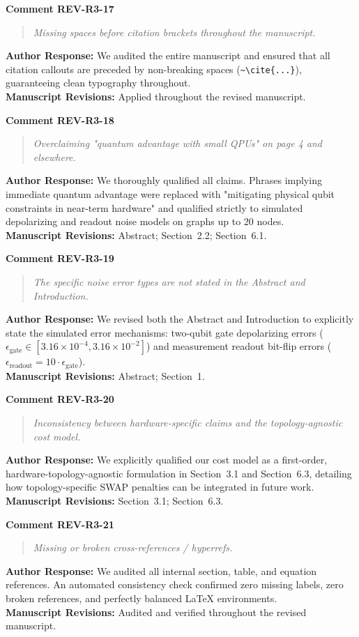 \documentclass[11pt,a4paper]{article}
\newcommand{\commentbox}[2]{
    \vspace{0.8em}
    \noindent\textbf{\textcolor{commentcolor}{#1}}
    \vspace{0.2em}
    \begin{quote}
        \small\itshape #2
    \end{quote}
}
\newcommand{\responsebox}[1]{
    \noindent\textbf{\textcolor{responsecolor}{Author Response:}} #1
    \vspace{0.8em}
}
\begin{document}
\commentbox{Comment REV-R3-17}{Missing spaces before citation brackets throughout the manuscript.}

\responsebox{We audited the entire manuscript and ensured that all citation callouts are preceded by non-breaking spaces (\texttt{\textasciitilde\textbackslash cite\{...\}}), guaranteeing clean typography throughout.
\\[0.3em]
\textbf{Manuscript Revisions:} Applied throughout the revised manuscript.}

\commentbox{Comment REV-R3-18}{Overclaiming "quantum advantage with small QPUs" on page 4 and elsewhere.}

\responsebox{We thoroughly qualified all claims. Phrases implying immediate quantum advantage were replaced with "mitigating physical qubit constraints in near-term hardware" and qualified strictly to simulated depolarizing and readout noise models on graphs up to 20 nodes.
\\[0.3em]
\textbf{Manuscript Revisions:} Abstract; Section~2.2; Section~6.1.}

\commentbox{Comment REV-R3-19}{The specific noise error types are not stated in the Abstract and Introduction.}

\responsebox{We revised both the Abstract and Introduction to explicitly state the simulated error mechanisms: two-qubit gate depolarizing errors ($\epsilon_{\text{gate}} \in [3.16 \times 10^{-4}, 3.16 \times 10^{-2}]$) and measurement readout bit-flip errors ($\epsilon_{\text{readout}} = 10 \cdot \epsilon_{\text{gate}}$).
\\[0.3em]
\textbf{Manuscript Revisions:} Abstract; Section~1.}

\commentbox{Comment REV-R3-20}{Inconsistency between hardware-specific claims and the topology-agnostic cost model.}

\responsebox{We explicitly qualified our cost model as a first-order, hardware-topology-agnostic formulation in Section~3.1 and Section~6.3, detailing how topology-specific SWAP penalties can be integrated in future work.
\\[0.3em]
\textbf{Manuscript Revisions:} Section~3.1; Section~6.3.}

\commentbox{Comment REV-R3-21}{Missing or broken cross-references / hyperrefs.}

\responsebox{We audited all internal section, table, and equation references. An automated consistency check confirmed zero missing labels, zero broken references, and perfectly balanced LaTeX environments.
\\[0.3em]
\textbf{Manuscript Revisions:} Audited and verified throughout the revised manuscript.}
\end{document}
